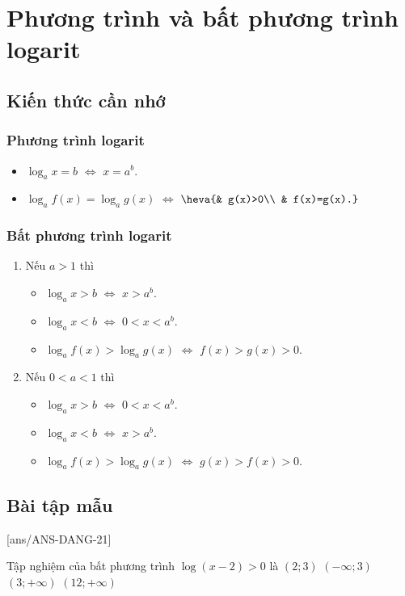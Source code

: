 \setcounter{ex}{0}
\section{Phương trình và bất phương trình logarit}
\subsection{Kiến thức cần nhớ}
\begin{khung}
	\subsubsection{Phương trình logarit}
	\begin{itemize}
		\item $\log_a x=b$ $\Leftrightarrow$ $x=a^b$.
		\item $\log_a f(x)=\log_a g(x)$ $\Leftrightarrow$ $\heva{& g(x)>0\\ & f(x)=g(x).}$
	\end{itemize}
	\subsubsection{Bất phương trình logarit}
	\begin{enumerate}%
		\item Nếu $a>1$ thì
		\begin{itemize}
			\item $\log_a x>b$ $\Leftrightarrow$ $x>a^b$.
			\item $\log_a x<b$ $\Leftrightarrow$ $0<x<a^b$.
			\item $\log_a f(x)>\log_a g(x)$ $\Leftrightarrow$ $f(x)>g(x)>0$.
		\end{itemize}
		\item Nếu $0<a<1$ thì
		\begin{itemize}
			\item $\log_a x>b$ $\Leftrightarrow$ $0<x<a^b$.
			\item $\log_a x<b$ $\Leftrightarrow$ $x>a^b$.
			\item $\log_a f(x)>\log_a g(x)$ $\Leftrightarrow$ $g(x)>f(x)>0$.
		\end{itemize}
	\end{enumerate}
\end{khung}
\subsection{Bài tập mẫu}
\setcounter{vd}{20}
[ans/ANS-DANG-21]
\begin{khung}
	\begin{vd}%
		Tập nghiệm của bất phương trình $\log \left(x-2\right)>0$ là
		\choice
		{$\left(2; 3\right)$}
		{$\left(-\infty; 3\right)$}
		{\True $\left(3;+\infty\right)$}
		{$\left(12;+\infty\right)$}
	\end{vd}
\end{khung}
